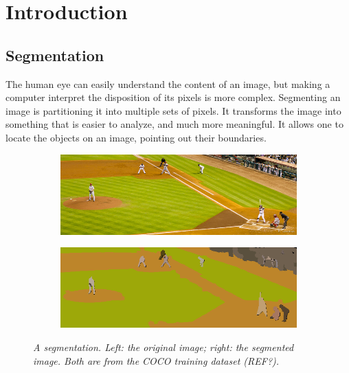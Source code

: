 \documentclass{article}
\begin{document}
\newpage
\section{Introduction}

    \subsection{Segmentation}
            The human eye can easily understand the content of an image, but making a computer interpret the disposition of its pixels is more complex. Segmenting an image is partitioning it into multiple sets of pixels. It transforms the image into something that is easier to analyze, and much more meaningful. It allows one to locate the objects on an image, pointing out their boundaries.

            \begin{figure}[!ht]
            \centering
            \begin{subfigure}{.49\linewidth}
                \centering
                \includegraphics[width=0.9\linewidth]{pics/img_segm1.jpg}
            \end{subfigure}
            \begin{subfigure}{.49\linewidth}
                \centering
                \includegraphics[width=0.9\linewidth]{pics/img_segm2.png}
            \end{subfigure}
                \caption{\textit{A segmentation. Left: the original image; right: the segmented image. Both are from the COCO training dataset (REF?).}}
                \label{fig:segm}
            \end{figure}
\end{document}
